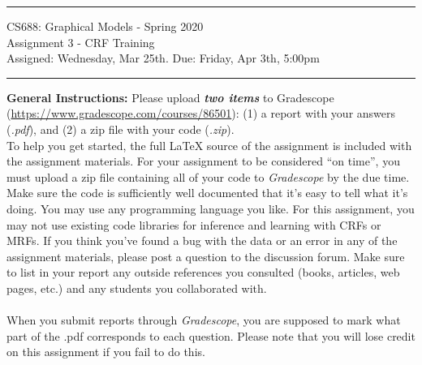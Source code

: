 \documentclass[11pt]{article}
\begin{document}
{\centering \rule{6.3in}{2pt} \vspace{1em} {\Large CS688: Graphical Models -
Spring 2020\\ Assignment 3 - CRF Training\\ } \vspace{1em}
Assigned: Wednesday, Mar 25th. Due: Friday, Apr 3th, 5:00pm\\ \vspace{0.1em} \rule{6.3in}{1.5pt}
}\vspace{1em}

\textbf{General Instructions:} Please upload {\em\bf two items} to {Gradescope} (\url{https://www.gradescope.com/courses/86501}): (1) a report with your answers (\textit{.pdf}), and (2) a zip file with your code (\textit{.zip}).\\
To help you get started, the full \LaTeX
source of the assignment is included with the assignment materials. For your
assignment to be considered ``on time'', you must upload a zip file containing
all of your code to \textit{Gradescope} by the due time. Make sure the code is sufficiently
well documented that it's easy to tell what it's doing. You may use any
programming language you like. For this assignment, you may not use
existing code libraries for inference and learning with CRFs or MRFs. If you
think you've found a bug with the data or an error in any of the assignment
materials, please post a question to the discussion forum. Make sure to
list in your report any outside references you consulted (books, articles, web
pages, etc.) and any students you collaborated with.\\ \\
When you submit reports through \textit{Gradescope}, you are supposed to mark what part of the .pdf corresponds to each question. Please note that you will lose credit on this assignment if you fail to do this. \\
\end{document}
